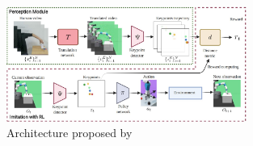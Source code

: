 \begin{figure}[!b]
    \centering
    \includegraphics[width=0.7\textwidth]{Figures/images/learning_by_watching/learning_by_watching.jpg}
    \caption{Architecture proposed by \cite{xiong2021learning_by_watching}}
    \label{fig:lbw}
\end{figure}
